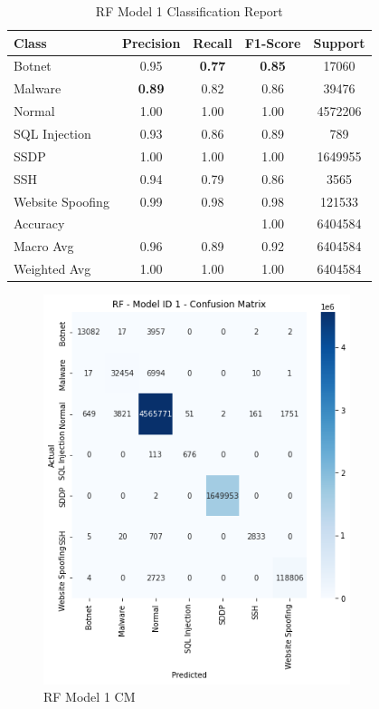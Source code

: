 \begin{table}[htbp]
  \centering
  \caption{RF Model 1 Classification Report}
  \label{tab:rf_class_report}
    \begin{tabular}{lcccc}
    \toprule
    Class & Precision & Recall & F1-Score & Support \\
    \midrule
    Botnet & 0.95 & {\color{red}\bfseries 0.77} & {\color{red}\bfseries 0.85} & 17060 \\
    Malware & {\color{red}\bfseries 0.89} & 0.82 & 0.86 & 39476 \\
    Normal & 1.00 & 1.00 & 1.00 & 4572206 \\
    SQL Injection & 0.93 & 0.86 & 0.89 & 789 \\
    SSDP & 1.00 & 1.00 & 1.00 & 1649955 \\
    SSH & 0.94 & 0.79 & 0.86 & 3565 \\
    Website Spoofing & 0.99 & 0.98 & 0.98 & 121533 \\
    \midrule
    Accuracy & & & 1.00 & 6404584 \\
    Macro Avg & 0.96 & 0.89 & 0.92 & 6404584 \\
    Weighted Avg & 1.00 & 1.00 & 1.00 & 6404584 \\
    \bottomrule
    \end{tabular}
\end{table}

\begin{figure}[H]
    \centering
	\includegraphics[width=0.8\textwidth]{Appendices/Images/RF/Model1/RF_Model1_CM.png}
	\caption{RF Model 1 CM}
  	\label{fig:rf_model1_cm}
\end{figure}

